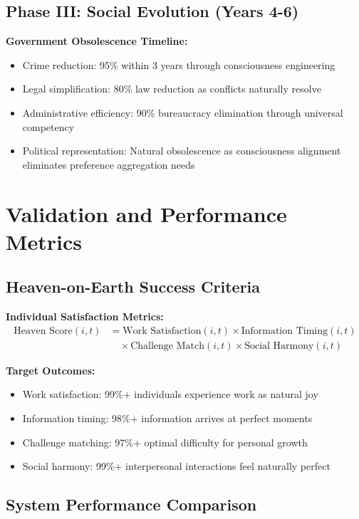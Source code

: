 \documentclass[12pt,a4paper]{article}
\begin{document}
\subsection{Phase III: Social Evolution (Years 4-6)}

\textbf{Government Obsolescence Timeline:}
\begin{itemize}
\item Crime reduction: 95\% within 3 years through consciousness engineering
\item Legal simplification: 80\% law reduction as conflicts naturally resolve
\item Administrative efficiency: 90\% bureaucracy elimination through universal competency
\item Political representation: Natural obsolescence as consciousness alignment eliminates preference aggregation needs
\end{itemize}

\section{Validation and Performance Metrics}

\subsection{Heaven-on-Earth Success Criteria}

\textbf{Individual Satisfaction Metrics:}
\begin{align}
\text{Heaven Score}(i,t) &= \text{Work Satisfaction}(i,t) \times \text{Information Timing}(i,t)\\
&\quad \times \text{Challenge Match}(i,t) \times \text{Social Harmony}(i,t)
\end{align}

\textbf{Target Outcomes:}
\begin{itemize}
\item Work satisfaction: 99\%+ individuals experience work as natural joy
\item Information timing: 98\%+ information arrives at perfect moments
\item Challenge matching: 97\%+ optimal difficulty for personal growth
\item Social harmony: 99\%+ interpersonal interactions feel naturally perfect
\end{itemize}

\subsection{System Performance Comparison}
\end{document}
